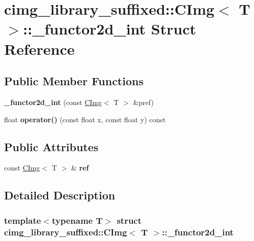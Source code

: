 \hypertarget{structcimg__library__suffixed_1_1CImg_1_1__functor2d__int}{}\section{cimg\+\_\+library\+\_\+suffixed\+:\+:C\+Img$<$ T $>$\+:\+:\+\_\+functor2d\+\_\+int Struct Reference}
\label{structcimg__library__suffixed_1_1CImg_1_1__functor2d__int}
\subsection*{Public Member Functions}
\begin{DoxyCompactItemize}
\item 
\mbox{\label{structcimg__library__suffixed_1_1CImg_1_1__functor2d__int_a074e1ac30146d816693b3f59bcb9f14a}} 
{\bfseries \+\_\+functor2d\+\_\+int} (const \hyperlink{structcimg__library__suffixed_1_1CImg}{C\+Img}$<$ T $>$ \&pref)
\item 
\mbox{\label{structcimg__library__suffixed_1_1CImg_1_1__functor2d__int_a32a5f7766c10e90a78d2b64aa8303233}} 
float {\bfseries operator()} (const float x, const float y) const
\end{DoxyCompactItemize}
\subsection*{Public Attributes}
\begin{DoxyCompactItemize}
\item 
\mbox{\label{structcimg__library__suffixed_1_1CImg_1_1__functor2d__int_a952a4a6b8aea9d7fe271512db336a0bf}} 
const \hyperlink{structcimg__library__suffixed_1_1CImg}{C\+Img}$<$ T $>$ \& {\bfseries ref}
\end{DoxyCompactItemize}


\subsection{Detailed Description}
\subsubsection*{template$<$typename T$>$\newline
struct cimg\+\_\+library\+\_\+suffixed\+::\+C\+Img$<$ T $>$\+::\+\_\+functor2d\+\_\+int}



